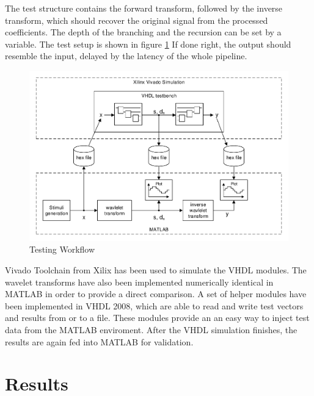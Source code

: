 \begin{refsection}
The test structure contains the forward transform, followed by the inverse transform, which should recover the original signal from the processed coefficients.
The depth of the branching and the recursion can be set by a variable. 
The test setup is shown in figure \ref{fpga:fig:testing}
If done right, the output should resemble the input, delayed by the latency of the whole pipeline.

\begin{figure}
	\centering
	\includegraphics[width=\textwidth]{./images/vhdl_sim.pdf}
	\caption{Testing Workflow \label{fpga:fig:testing}}
\end{figure}

Vivado Toolchain from Xilix has been used to simulate the VHDL modules.
The wavelet transforms have also been implemented numerically identical in MATLAB in order to provide a direct comparison. 
A set of helper modules have been implemented in VHDL 2008, which are able to read and write test vectors and results from or to a file.
These modules provide an an easy way to inject test data from the MATLAB enviroment.
After the VHDL simulation finishes, the results are again fed into MATLAB for validation.

\section{Results}


\end{refsection}
